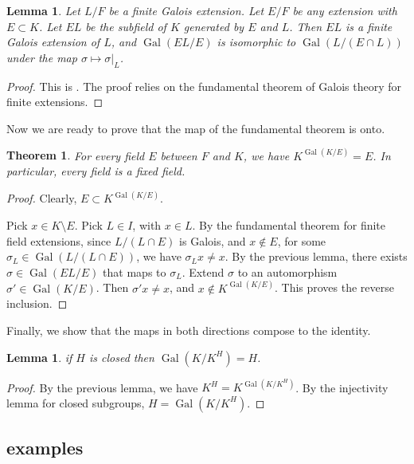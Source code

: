\documentclass{amsart}
\def\op#1{{\operatorname{#1}}}
\newtheorem{theorem}[equation]{Theorem}
\newtheorem{lemma}[equation]{Lemma}
\begin{document}
\begin{lemma}
Let $L/F$ be a finite Galois extension.  Let $E/F$ be any extension with $E\subset K$.
Let $EL$ be the subfield of $K$ generated by $E$ and $L$.  Then
$EL$ is a finite Galois extension of $L$, and 
$\op{Gal}(EL/E)$ is isomorphic to $\op{Gal}(L/(E\cap L))$ under the map 
$\sigma\mapsto\sigma|_L$.
\end{lemma}

\begin{proof} This is \cite[14.4~Prop.~19]{DF}. The proof relies on the fundamental
theorem of Galois theory for finite extensions.
\end{proof}


Now we are ready to prove that the map of the fundamental theorem is onto.

\begin{theorem}
For every field $E$ between $F$ and $K$, we have $K^{\op{Gal}(K/E)}  = E$.
In particular, every field is a fixed field.
\end{theorem}

\begin{proof} 
Clearly, $E\subset K^{\op{Gal}(K/E)}$.

Pick $x\in K\setminus E$.  Pick $L\in I$, with $x\in L$.
  By the fundamental theorem for finite field extensions, since
  $L/(L\cap E)$ is Galois, and $x\not\in E$, for some $\sigma_L\in
  \op{Gal}(L/(L\cap E))$, we have $\sigma_L x \ne x$.
By the previous lemma, there exists $\sigma\in \op{Gal}(EL/E)$ that maps
to $\sigma_L$.  Extend $\sigma$ to an automorphism $\sigma'\in\op{Gal}(K/E)$.
Then $\sigma'x \ne x$, and $x\not\in K^{\op{Gal}(K/E)}$.  
This proves the reverse inclusion.
\end{proof}

Finally, we show that the maps in both directions compose to the identity.

\begin{lemma} if $H$ is closed then $\op{Gal}(K/K^H) = H$.
\end{lemma}

\begin{proof}
By the previous lemma,
we have $K^H = K^{\op{Gal}(K/K^H)}$.  By the injectivity lemma for closed subgroups,
$H = \op{Gal}(K/K^H)$.
\end{proof}



\subsection{examples}
\end{document}
